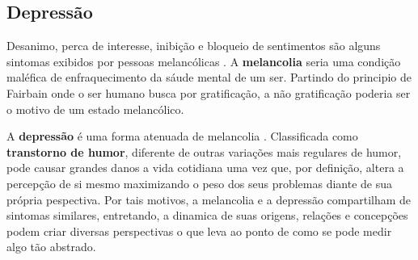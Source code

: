 \subsection{Depressão}
Desanimo, perca de interesse, inibição e bloqueio de sentimentos são alguns sintomas exibidos por pessoas melancólicas \cite[276]{freud}. A \textbf{melancolia} seria uma condição maléfica de enfraquecimento da sáude mental de um ser. Partindo do principio de Fairbain onde o ser humano busca por gratificação, a não gratificação poderia ser o motivo de um estado melancólico.

A \textbf{depressão} é uma forma atenuada de melancolia \cite{roudinesco2000}. Classificada como \textbf{transtorno de humor}, diferente de outras variações mais regulares de humor, pode causar grandes danos a vida cotidiana uma vez que, por definição, altera a percepção de si mesmo maximizando o peso dos seus problemas diante de sua própria pespectiva. Por tais motivos, a melancolia e a depressão compartilham de sintomas similares, entretando, a dinamica de suas origens, relações e concepções podem criar diversas perspectivas o que leva ao ponto de como se pode medir algo tão abstrado. \cite{}
